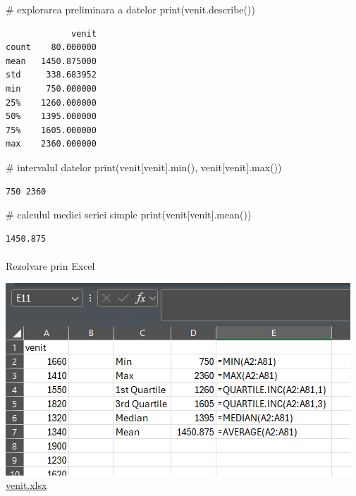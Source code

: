 \documentclass[
  11pt,
  b5paper,
  nottoc]{book}
\makeatletter
\let\oldparagraph\paragraph
\renewcommand{\paragraph}{
    \@ifstar
      \xxxParagraphStar
      \xxxParagraphNoStar
  }
\newcommand{\xxxParagraphStar}[1]{\oldparagraph*{#1}\mbox{}}
\newcommand{\xxxParagraphNoStar}[1]{\oldparagraph{#1}\mbox{}}
\newenvironment{Shaded}{\begin{snugshade}}{\end{snugshade}}
\newcommand{\BuiltInTok}[1]{\textcolor[rgb]{0.00,0.23,0.31}{#1}}
\newcommand{\CommentTok}[1]{\textcolor[rgb]{0.37,0.37,0.37}{#1}}
\newcommand{\NormalTok}[1]{\textcolor[rgb]{0.00,0.23,0.31}{#1}}
\newcommand{\StringTok}[1]{\textcolor[rgb]{0.13,0.47,0.30}{#1}}
\makeatother
\begin{document}
\begin{Shaded}
\begin{Highlighting}[]
\CommentTok{\# explorarea preliminara a datelor}
\BuiltInTok{print}\NormalTok{(venit.describe())}
\end{Highlighting}
\end{Shaded}

\begin{verbatim}
             venit
count    80.000000
mean   1450.875000
std     338.683952
min     750.000000
25%    1260.000000
50%    1395.000000
75%    1605.000000
max    2360.000000
\end{verbatim}

\begin{Shaded}
\begin{Highlighting}[]
\CommentTok{\# intervalul datelor}
\BuiltInTok{print}\NormalTok{(venit[}\StringTok{\textquotesingle{}venit\textquotesingle{}}\NormalTok{].}\BuiltInTok{min}\NormalTok{(), venit[}\StringTok{\textquotesingle{}venit\textquotesingle{}}\NormalTok{].}\BuiltInTok{max}\NormalTok{())}
\end{Highlighting}
\end{Shaded}

\begin{verbatim}
750 2360
\end{verbatim}

\begin{Shaded}
\begin{Highlighting}[]
\CommentTok{\# calculul mediei seriei simple}
\BuiltInTok{print}\NormalTok{(venit[}\StringTok{\textquotesingle{}venit\textquotesingle{}}\NormalTok{].mean())}
\end{Highlighting}
\end{Shaded}

\begin{verbatim}
1450.875
\end{verbatim}

\paragraph{Rezolvare prin Excel}\label{rezolvare-prin-excel}

\includegraphics{date/medie_simpla.PNG}\\
\href{date/venit.xlsx}{venit.xlsx}
\end{document}
